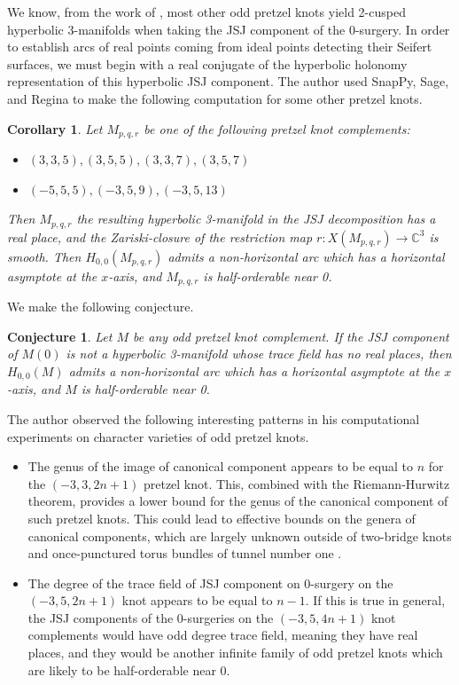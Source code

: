 \documentclass{article}
\theoremstyle{plain}
\theoremstyle{definition}
\theoremstyle{plain}
\theoremstyle{plain}
\newtheorem{corollary}[theorem]{Corollary}
\theoremstyle{plain}
\theoremstyle{remark}
\theoremstyle{remark}
\theoremstyle{plain}
\newtheorem{conjecture}[theorem]{Conjecture}
\theoremstyle{plain}
\begin{document}
We know, from the work of \cite{sekino}, most other odd pretzel knots yield 2-cusped hyperbolic 3-manifolds when taking the JSJ component of the 0-surgery. In order to establish arcs of real points coming from ideal points detecting their Seifert surfaces, we must begin with a real conjugate of the hyperbolic holonomy representation of this hyperbolic JSJ component. The author used SnapPy, Sage, and Regina to make the following computation for some other pretzel knots.

\begin{corollary}
Let $M_{p, q, r}$ be one of the following pretzel knot complements:
\begin{itemize}
	\item $(3, 3, 5), (3, 5, 5), (3, 3, 7), (3, 5, 7)$
	\item $(-5, 5, 5), (-3, 5, 9), (-3, 5, 13)$
\end{itemize} 
Then $M_{p, q, r}$ the resulting hyperbolic 3-manifold in the JSJ decomposition has a real place, and the Zariski-closure of the restriction map $r: X(M_{p, q, r}) \to \mathbb{C}^3$ is smooth. Then $H_{0, 0}(M_{p, q, r})$ admits a non-horizontal arc which has a horizontal asymptote at the $x$-axis, and $M_{p, q, r}$ is half-orderable near 0.
\end{corollary}

We make the following conjecture. 

\begin{conjecture}
Let $M$ be any odd pretzel knot complement. If the JSJ component of $M(0)$ is not a hyperbolic 3-manifold whose trace field has no real places, then $H_{0, 0}(M)$ admits a non-horizontal arc which has a horizontal asymptote at the $x$-axis, and $M$ is half-orderable near 0.
\end{conjecture}

The author observed the following interesting patterns in his computational experiments on character varieties of odd pretzel knots.
\begin{itemize}
	\item The genus of the image of canonical component appears to be equal to $n$ for the $(-3, 3, 2n+1)$ pretzel knot. This, combined with the Riemann-Hurwitz theorem, provides a lower bound for the genus of the canonical component of such pretzel knots. This could lead to effective bounds on the genera of canonical components, which are largely unknown outside of two-bridge knots \cite{petersen} and once-punctured torus bundles of tunnel number one \cite{bakerpetersen}. 
	\item The degree of the trace field of JSJ component on 0-surgery on the $(-3, 5, 2n+1)$ knot appears to be equal to $n - 1$. If this is true in general, the JSJ components of the 0-surgeries on the $(-3, 5, 4n+1)$ knot complements would have odd degree trace field, meaning they have real places, and they would be another infinite family of odd pretzel knots which are likely to be half-orderable near 0.
\end{itemize}
\end{document}
